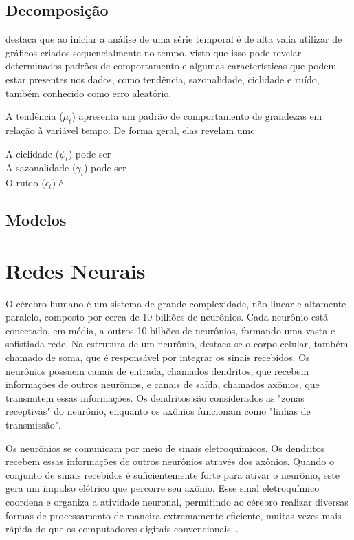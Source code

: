     \subsection{Decomposição}

         destaca que ao iniciar a análise de uma série temporal é de alta valia utilizar de gráficos 
        criados sequencialmente no tempo, visto que isso pode revelar determinados padrões de comportamento e algumas 
        características que podem estar presentes nos dados, como tendência, sazonalidade, ciclidade e ruído, também 
        conhecido como erro aleatório. 

        A tendência ($\mu_t$) apresenta um padrão de comportamento de grandezas em relação à variável tempo. De forma
        geral, elas revelam umc
        
        A ciclidade ($\psi_t$) pode ser \\
        
        A sazonalidade ($\gamma_t$) pode ser \\
        
        O ruído ($\epsilon_t$) é 


    \subsection{Modelos}


\section{Redes Neurais}
    O cérebro humano é um sistema de grande complexidade, não linear e altamente paralelo, composto por cerca de 
    10 bilhões de neurônios. Cada neurônio está conectado, em média, a outros 10 bilhões de neurônios, formando uma 
    vasta e sofistiada rede. Na estrutura de um neurônio, destaca-se o corpo celular, também chamado de soma, que é 
    responsável por integrar os sinais recebidos. Os neurônios possuem canais de entrada, chamados dendritos, que 
    recebem informações de outros neurônios, e canais de saída, chamados axônios, que transmitem essas informações. 
    Os dendritos são considerados as "zonas receptivas" do neurônio, enquanto os axônios funcionam como 
    "linhas de transmissão".

    Os neurônios se comunicam por meio de sinais eletroquímicos. Os dendritos recebem essas informações de outros 
    neurônios através dos axônios. Quando o conjunto de sinais recebidos é suficientemente forte para ativar o 
    neurônio, este gera um impulso elétrico que percorre seu axônio. Esse sinal eletroquímico coordena e organiza a 
    atividade neuronal, permitindo ao cérebro realizar diversas formas de processamento de maneira extremamente 
    eficiente, muitas vezes mais rápida do que os computadores digitais convencionais~\cite{haykin2009neural}.

